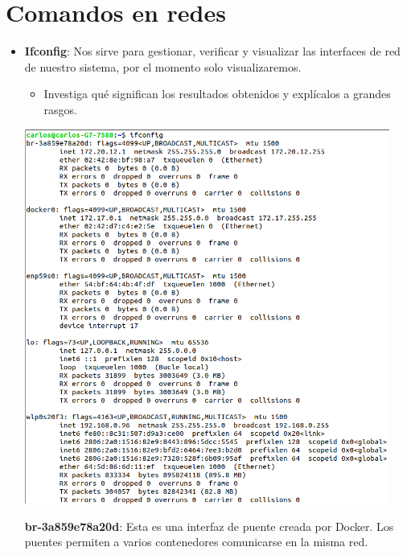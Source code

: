 \section*{Comandos en redes}

\begin{itemize}
    \item \textbf{Ifconfig}: Nos sirve para gestionar, verificar y visualizar las interfaces de red de nuestro sistema, por el momento solo visualizaremos.
    \begin{itemize}
        \item Investiga qué significan los resultados obtenidos y explícalos a grandes rasgos.
    \end{itemize}

    \begin{center}
        \includegraphics[width=12cm]{IMAGE/ifconfig.png}
    \end{center}
    
    \textbf{br-3a859e78a20d}: Esta es una interfaz de puente creada por Docker. Los puentes permiten a varios contenedores comunicarse en la misma red.
    

\end{itemize}
